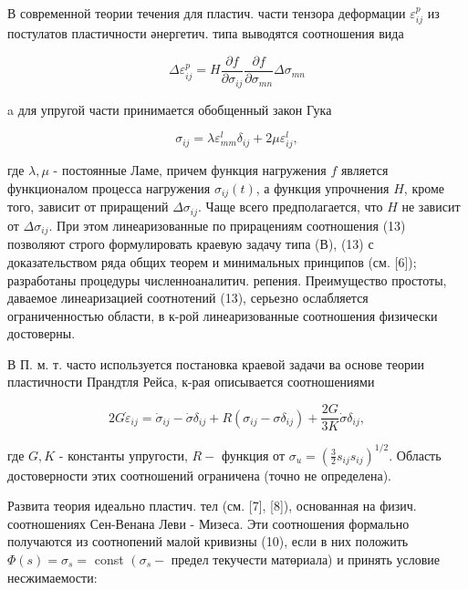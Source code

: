 \documentclass[10pt]{article}
\begin{document}
В современной теории течения для пластич. части тензора деформации $\varepsilon_{i j}^{p}$ из постулатов пластичности әнергетич. типа выводятся соотношения вида



\[

\Delta \varepsilon_{i j}^{p}=H \frac{\partial f}{\partial \sigma_{i j}} \frac{\partial f}{\partial \sigma_{m n}} \Delta \sigma_{m n}

\]



a для упругой части принимается обобщенный закон Гука



\[

\sigma_{i j}=\lambda \varepsilon_{m m}^{l} \delta_{i j}+2 \mu \varepsilon_{i j}^{l},

\]



где $\lambda, \mu$ - постоянные Ламе, причем функция нагружения $f$ является функционалом процесса нагружения $\sigma_{i j}(t)$, а функция упрочнения $H$, кроме того, зависит от приращений $\Delta \sigma_{i j}$. Чаще всего предполагается, что $H$ не зависит от $\Delta \sigma_{i j}$. При этом линеаризованные по прирацениям соотношения (13) позволяют строго формулировать краевую задачу типа (В), (13) с доказательством ряда общих теорем и минимальных принципов (см. [6]); разработаны процедуры численноаналитич. репения. Преимущество простоты, даваемое линеаризацией соотнотений (13), серьезно ослабляется ограниченностью области, в к-рой линеаризованные соотношения физически достоверны.



В П. м. т. часто используется постановка краевой задачи ва основе теории пластичности Прандтля Рейса, к-рая описывается соотношениями



\[

2 G \dot{\varepsilon}_{i j}=\dot{\sigma}_{i j}-\dot{\sigma} \delta_{i j}+R\left(\sigma_{i j}-\sigma \delta_{i j}\right)+\frac{2 G}{3 K} \dot{\sigma} \delta_{i j},

\]



где $G, K$ - константы упругости, $R-$ функция от $\sigma_{u}=\left(\frac{3}{2} s_{i j} s_{i j}\right)^{1 / 2}$. Область достоверности этих соотношений ограничена (точно не определена).



Развита теория идеально пластич. тел (см. [7], [8]), основанная на физич. соотношениях Сен-Венана Леви - Мизеса. Эти соотношения формально получаются из соотнопений малой кривизны (10), если в них положить $\Phi(s)=\sigma_{s}=$ const $\left(\sigma_{s}-\right.$ предел текучести матөриала) и принять условие несжимаемости:
\end{document}
